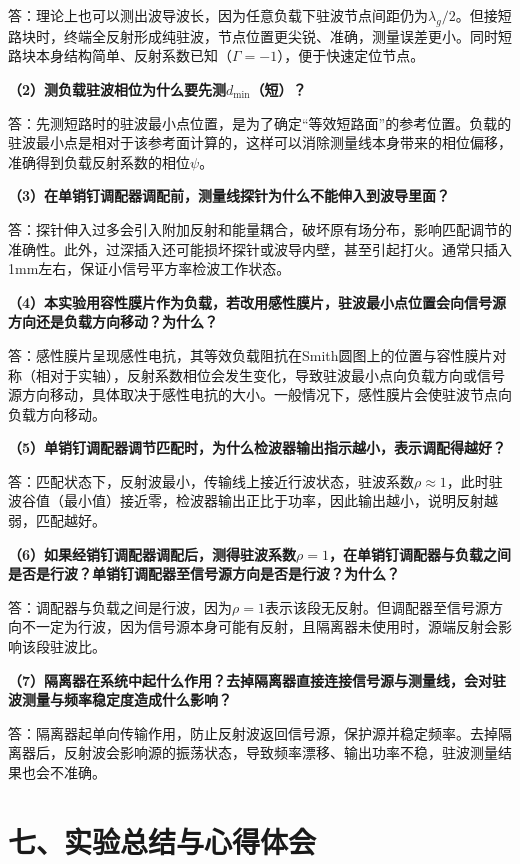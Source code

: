 \documentclass[12pt,a4paper]{article}
\begin{document}
答：理论上也可以测出波导波长，因为任意负载下驻波节点间距仍为$\lambda_g/2$。但接短路块时，终端全反射形成纯驻波，节点位置更尖锐、准确，测量误差更小。同时短路块本身结构简单、反射系数已知（$\Gamma=-1$），便于快速定位节点。

\textbf{（2）测负载驻波相位为什么要先测$d_{\text{min}}$（短）？}

答：先测短路时的驻波最小点位置，是为了确定“等效短路面”的参考位置。负载的驻波最小点是相对于该参考面计算的，这样可以消除测量线本身带来的相位偏移，准确得到负载反射系数的相位$\psi$。

\textbf{（3）在单销钉调配器调配前，测量线探针为什么不能伸入到波导里面？}

答：探针伸入过多会引入附加反射和能量耦合，破坏原有场分布，影响匹配调节的准确性。此外，过深插入还可能损坏探针或波导内壁，甚至引起打火。通常只插入1mm左右，保证小信号平方率检波工作状态。

\textbf{（4）本实验用容性膜片作为负载，若改用感性膜片，驻波最小点位置会向信号源方向还是负载方向移动？为什么？}

答：感性膜片呈现感性电抗，其等效负载阻抗在Smith圆图上的位置与容性膜片对称（相对于实轴），反射系数相位会发生变化，导致驻波最小点向负载方向或信号源方向移动，具体取决于感性电抗的大小。一般情况下，感性膜片会使驻波节点向负载方向移动。

\textbf{（5）单销钉调配器调节匹配时，为什么检波器输出指示越小，表示调配得越好？}

答：匹配状态下，反射波最小，传输线上接近行波状态，驻波系数$\rho \approx 1$，此时驻波谷值（最小值）接近零，检波器输出正比于功率，因此输出越小，说明反射越弱，匹配越好。

\textbf{（6）如果经销钉调配器调配后，测得驻波系数$\rho = 1$，在单销钉调配器与负载之间是否是行波？单销钉调配器至信号源方向是否是行波？为什么？}

答：调配器与负载之间是行波，因为$\rho=1$表示该段无反射。但调配器至信号源方向不一定为行波，因为信号源本身可能有反射，且隔离器未使用时，源端反射会影响该段驻波比。

\textbf{（7）隔离器在系统中起什么作用？去掉隔离器直接连接信号源与测量线，会对驻波测量与频率稳定度造成什么影响？}

答：隔离器起单向传输作用，防止反射波返回信号源，保护源并稳定频率。去掉隔离器后，反射波会影响源的振荡状态，导致频率漂移、输出功率不稳，驻波测量结果也会不准确。



\section*{七、实验总结与心得体会}
\end{document}
